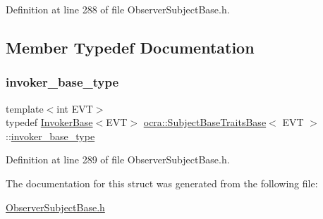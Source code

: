 Definition at line 288 of file Observer\+Subject\+Base.\+h.



\subsection{Member Typedef Documentation}
\hypertarget{structocra_1_1SubjectBaseTraitsBase_a439671662c8f8f3e80e6675f008dec3f}{}\label{structocra_1_1SubjectBaseTraitsBase_a439671662c8f8f3e80e6675f008dec3f} 
\subsubsection{\texorpdfstring{invoker\+\_\+base\+\_\+type}{invoker\_base\_type}}
{\footnotesize\ttfamily template$<$int E\+VT$>$ \\
typedef \hyperlink{classocra_1_1InvokerBase}{Invoker\+Base}$<$E\+VT$>$ \hyperlink{structocra_1_1SubjectBaseTraitsBase}{ocra\+::\+Subject\+Base\+Traits\+Base}$<$ E\+VT $>$\+::\hyperlink{structocra_1_1SubjectBaseTraitsBase_a439671662c8f8f3e80e6675f008dec3f}{invoker\+\_\+base\+\_\+type}}



Definition at line 289 of file Observer\+Subject\+Base.\+h.



The documentation for this struct was generated from the following file\+:\begin{DoxyCompactItemize}
\item 
\hyperlink{ObserverSubjectBase_8h}{Observer\+Subject\+Base.\+h}\end{DoxyCompactItemize}
